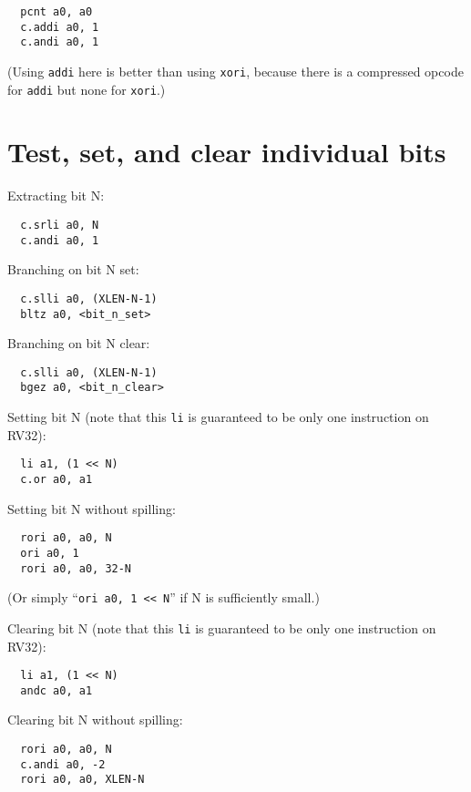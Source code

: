 \begin{verbatim}
  pcnt a0, a0
  c.addi a0, 1
  c.andi a0, 1
\end{verbatim}

(Using {\tt addi} here is better than using {\tt xori}, because there is
a compressed opcode for {\tt addi} but none for {\tt xori}.)

\section{Test, set, and clear individual bits}

Extracting bit N:

\begin{verbatim}
  c.srli a0, N
  c.andi a0, 1
\end{verbatim}

Branching on bit N set:

\begin{verbatim}
  c.slli a0, (XLEN-N-1)
  bltz a0, <bit_n_set>
\end{verbatim}

Branching on bit N clear:

\begin{verbatim}
  c.slli a0, (XLEN-N-1)
  bgez a0, <bit_n_clear>
\end{verbatim}

Setting bit N (note that this {\tt li} is guaranteed to be only one instruction on RV32):

\begin{verbatim}
  li a1, (1 << N)
  c.or a0, a1
\end{verbatim}

Setting bit N without spilling:

\begin{verbatim}
  rori a0, a0, N
  ori a0, 1
  rori a0, a0, 32-N
\end{verbatim}

(Or simply ``{\tt ori a0, 1 << N}'' if N is sufficiently small.)

Clearing bit N (note that this {\tt li} is guaranteed to be only one instruction on RV32):

\begin{verbatim}
  li a1, (1 << N)
  andc a0, a1
\end{verbatim}

Clearing bit N without spilling:

\begin{verbatim}
  rori a0, a0, N
  c.andi a0, -2
  rori a0, a0, XLEN-N
\end{verbatim}

